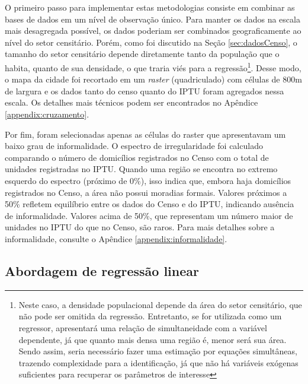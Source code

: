 O primeiro passo para implementar estas metodologias consiste em combinar as bases de dados em um nível de observação único. Para manter os dados na escala mais desagregada possível, os dados poderiam ser combinados geograficamente ao nível do setor censitário. Porém, como foi discutido na Seção \ref{sec:dadosCenso}, o tamanho do setor censitário depende diretamente tanto da população que o habita, quanto de sua densidade, o que traria viés para a regressão\footnote{Neste caso, a densidade populacional depende da área do setor censitário, que não pode ser omitida da regressão. Entretanto, se for utilizada como um regressor, apresentará uma relação de simultaneidade com a variável dependente, já que quanto mais densa uma região é, menor será sua área. Sendo assim, seria necessário fazer uma estimação por equações simultâneas, trazendo complexidade para a identificação, já que não há variáveis exógenas suficientes para recuperar os parâmetros de interesse}. Desse modo, o mapa da cidade foi recortado em um \textit{raster} (quadriculado) com células de 800m de largura e os dados tanto do censo quanto do IPTU foram agregados nessa escala. Os detalhes mais técnicos podem ser encontrados no Apêndice \ref{appendix:cruzamento}. 

Por fim, foram selecionadas apenas as células do raster que apresentavam um baixo grau de informalidade. O espectro de irregularidade foi calculado comparando o número de domicílios registrados no Censo com o total de unidades registradas no IPTU. Quando uma região se encontra no extremo esquerdo do espectro (próximo de 0\%), isso indica que, embora haja domicílios registrados no Censo, a área não possui moradias formais. Valores próximos a 50\% refletem equilíbrio entre os dados do Censo e do IPTU, indicando ausência de informalidade. Valores acima de 50\%, que representam um número maior de unidades no IPTU do que no Censo, são raros. Para mais detalhes sobre a informalidade, consulte o Apêndice \ref{appendix:informalidade}. 

\subsection{Abordagem de regressão linear}

{\tiny

}

